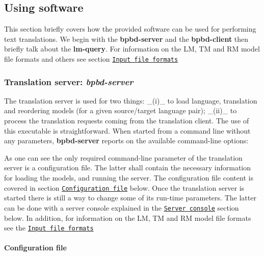 \subsection*{Using software}

This section briefly covers how the provided software can be used for performing text translations. We begin with the {\bfseries bpbd-\/server} and the {\bfseries bpbd-\/client} then briefly talk about the {\bfseries lm-\/query}. For information on the L\+M, T\+M and R\+M model file formats and others see section \href{#input-file-formats}{\tt Input file formats}

\subsubsection*{Translation server\+: {\itshape bpbd-\/server}}

The translation server is used for two things\+: \+\_\+(i)\+\_\+ to load language, translation and reordering models (for a given source/target language pair); \+\_\+(ii)\+\_\+ to process the translation requests coming from the translation client. The use of this executable is straightforward. When started from a command line without any parameters, {\bfseries bpbd-\/server} reports on the available command-\/line options\+:


 As one can see the only required command-\/line parameter of the translation server is a configuration file. The latter shall contain the necessary information for loading the models, and running the server. The configuration file content is covered in section \href{#configuration-file}{\tt Configuration file} below. Once the translation server is started there is still a way to change some of its run-\/time parameters. The latter can be done with a server console explained in the \href{#server-console}{\tt Server console} section below. In addition, for information on the L\+M, T\+M and R\+M model file formats see the \href{#input-file-formats}{\tt Input file formats}

\paragraph*{Configuration file}


